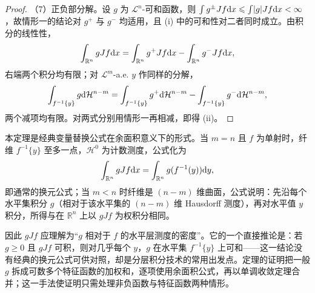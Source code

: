 \documentclass[../../main.tex]{subfiles}%
\begin{document}
\begin{proof}
（7）正负部分解。设 $g$ 为 $\mathcal{L}^n$-可和函数，则 $\int g^{\pm}Jf\mathrm{d} x\leqslant\int\lvert g\rvert Jf\mathrm{d} x<\infty$，故情形一的结论对 $g^{+}$ 与 $g^{-}$ 均适用，且 (i) 中的可和性对二者同时成立。由积分的线性性，
\begin{align*}
\int_{\mathbb{R}^n}gJf\mathrm{d} x=\int_{\mathbb{R}^n}g^{+}Jf\mathrm{d} x-\int_{\mathbb{R}^n}g^{-}Jf\mathrm{d} x,
\end{align*}
右端两个积分均有限；对 $\mathcal{L}^m$-a.e. $y$ 作同样的分解，
\begin{align*}
\int_{f^{-1}\{y\}}g\mathrm{d}\mathcal{H}^{n-m}=\int_{f^{-1}\{y\}}g^{+}\mathrm{d}\mathcal{H}^{n-m}-\int_{f^{-1}\{y\}}g^{-}\mathrm{d}\mathcal{H}^{n-m},
\end{align*}
两个减项均有限。对两式分别用情形一再相减，即得 (ii)。
\end{proof}

\begin{remark}\label{remark:ch03-thm-3-11-动机}
本定理是经典变量替换公式在余面积意义下的形式。当 $m=n$ 且 $f$ 为单射时，纤维 $f^{-1}\{y\}$ 至多一点，$\mathcal{H}^0$ 为计数测度，公式化为
\begin{align*}
\int_{\mathbb{R}^n}gJf\mathrm{d} x=\int_{\mathbb{R}^n}g(f^{-1}(y))\mathrm{d} y,
\end{align*}
即通常的换元公式；当 $m<n$ 时纤维是 $(n-m)$ 维曲面，公式说明：先沿每个水平集积分 $g$（相对于该水平集的 $(n-m)$ 维 Hausdorff 测度），再对水平值 $y$ 积分，所得与在 $\mathbb{R}^n$ 上以 $gJf$ 为权积分相同。

因此 $gJf$ 应理解为“$g$ 相对于 $f$ 的水平层测度的密度”。它的一个直接推论是：若 $g\geqslant0$ 且 $gJf$ 可积，则对几乎每个 $y$，$g$ 在水平集 $f^{-1}\{y\}$ 上可和——这一结论没有经典的换元公式可供对照，却是分层积分技术的常用出发点。定理的证明把一般 $g$ 拆成可数多个特征函数的加权和，逐项使用余面积公式，再以单调收敛定理合并；这一手法使证明只需处理非负函数与特征函数两种情形。
\end{remark}
\end{document}
